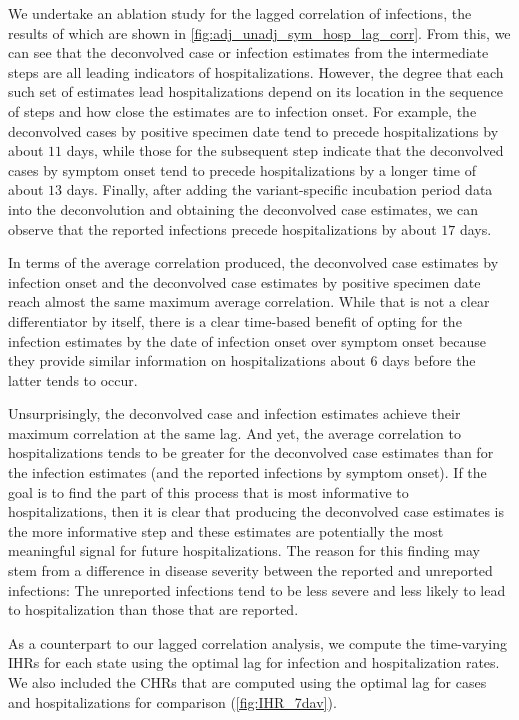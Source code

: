 \documentclass{article}
\begin{document}
We undertake an ablation study for the lagged correlation of infections, the results of which 
are shown in \autoref{fig:adj_unadj_sym_hosp_lag_corr}. From this, we can see that the 
deconvolved case or infection estimates from the intermediate 
steps are all leading indicators of hospitalizations. However, the degree that each such set of estimates
lead hospitalizations depend on its location in the sequence of steps and how close the estimates 
are to infection onset. For example, the deconvolved cases by positive specimen date
tend to precede hospitalizations by about $11$ days, 
while those for the subsequent step indicate that the deconvolved cases by symptom onset tend to 
precede hospitalizations by a longer time of about $13$ days. Finally, after adding the variant-specific 
incubation period data into the deconvolution and obtaining the deconvolved case estimates, 
we can observe that the reported infections precede
hospitalizations by about $17$ days. 

In terms of the average correlation produced, the deconvolved case estimates by infection onset
 and the deconvolved case estimates by positive specimen date reach almost
  the same maximum average correlation. While that is not a clear differentiator by itself, 
  there is a clear time-based benefit of opting for the infection estimates by the date of infection onset
   over symptom onset because they provide similar information 
on hospitalizations about $6$ days before the latter tends to occur.

Unsurprisingly, the deconvolved case and infection estimates achieve their maximum correlation
at the same lag. And yet, the average correlation to hospitalizations
tends to be greater for the deconvolved case estimates than for the infection estimates (and
the reported infections by symptom onset). If the goal is to find the part of this process that is most
 informative to hospitalizations, then it is clear that producing the deconvolved case estimates is 
 the more informative step and these estimates are potentially the most meaningful signal for
  future hospitalizations. The reason for this finding may stem from a difference in disease
   severity between the reported and unreported infections: The unreported infections tend to 
   be less severe and less likely to lead to hospitalization than those that are reported.

As a counterpart to our lagged correlation analysis, we compute the time-varying IHRs 
for each state using the optimal lag for infection and hospitalization rates. We also included
the CHRs that are computed using the optimal lag for cases and hospitalizations for comparison
(\autoref{fig:IHR_7dav}). 
\end{document}
